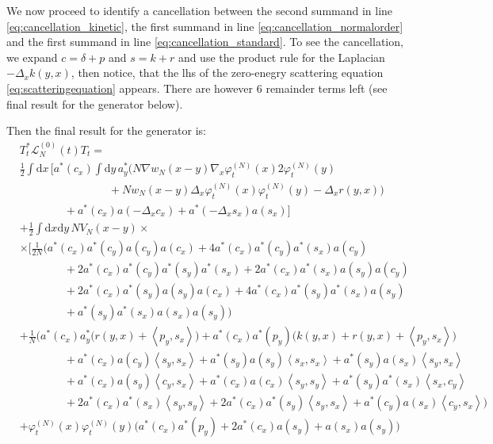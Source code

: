 \documentclass[11pt,a4paper,twoside,headsepline]{scrartcl}
\newcommand{\di}{\textrm{d}}		%
\newcommand{\Lcal}{\mathcal{L}}		%
\newcommand{\scal}[2]{\left<#1,#2\right>} %
\newcommand{\ph}{\varphi_t^{(N)}}	%
\newcommand{\eqr}[1]{\eqref{eq:#1}}			%
\begin{document}
We now proceed to identify a cancellation between the second summand in line \eqr{cancellation_kinetic}, the first summand in line \eqr{cancellation_normalorder} and the first summand in line \eqr{cancellation_standard}. To see the cancellation, we expand $c = \delta + p$ and $s = k + r$ and use the product rule for the Laplacian $-\Delta_x k(y,x)$, then notice, that the lhs of the zero-enegry scattering equation \eqr{scatteringequation} appears. There are however 6 remainder terms left (see final result for the generator below).

Then the final result for the generator is:
\begin{align*}
& T^*_t \Lcal_N^{(0)}(t) T_t = \\ 
& \frac{1}{2} \int \di x\, \bigg[ a^*(c_x) \int \di y\, a^*_y \Big( N \nabla w_N(x-y) \nabla_x \ph(x) 2 \ph(y) \\
& \qquad\qquad \qquad\qquad						+ Nw_N(x-y) \Delta_x \ph(x) \ph(y) - \Delta_x r(y,x) \Big) \\
& \qquad\qquad 			+ a^*(c_x) a(-\Delta_x c_x) + a^*(-\Delta_x s_x) a(s_x) \bigg] \\
& + \frac{1}{2}\int \di x \di y\, NV_N(x-y) \times \\
& \times \Big[   \frac{1}{2N}\bigg( a^*(c_x) a^*(c_y) a(c_y) a(c_x) + 4 a^*(c_x) a^*(c_y) a^*(s_x) a(c_y) \\
				      & \qquad\qquad + 2 a^*(c_x) a^*(c_y) a^*(s_y) a^*(s_x) + 2 a^*(c_x) a^*(s_x) a(s_y) a(c_y) \\
				      & \qquad\qquad + 2 a^*(c_x) a^*(s_y) a(s_y) a(c_x) + 4 a^*(c_x) a^*(s_y) a^*(s_x) a(s_y) \\
				      & \qquad\qquad + a^*(s_y) a^*(s_x) a(s_x) a(s_y) \bigg) \\
& + \frac{1}{N}\bigg(   a^*(c_x) a^*_y \Big( r(y,x) + \scal{p_y}{s_x} \Big) + a^*(c_x) a^*(p_y) \Big( k(y,x) + r(y,x) + \scal{p_y}{s_x} \Big) \\
      & \qquad\qquad + a^*(c_x) a(c_y) \scal{s_y}{s_x} + a^*(s_y) a(s_y) \scal{s_x}{s_x} + a^*(s_y) a(s_x) \scal{s_y}{s_x}\\
      & \qquad\qquad + a^*(c_x) a(s_y) \scal{c_y}{s_x} + a^*(c_x) a(c_x) \scal{s_y}{s_y} + a^*(s_y) a^*(s_x) \scal{s_x}{c_y}\\
      & \qquad\qquad + 2a^*(c_x) a^*(s_x) \scal{s_y}{s_y} + 2a^*(c_x)a^*(s_y) \scal{s_y}{s_x} + a^*(c_y) a(s_x) \scal{c_y}{s_x}    \bigg) \\
& + \ph(x)\ph(y) \Big( a^*(c_x) a^*(p_y) + 2 a^*(c_x) a(s_y) +a(s_x) a(s_y) \Big) \\

\end{align*}
\end{document}
